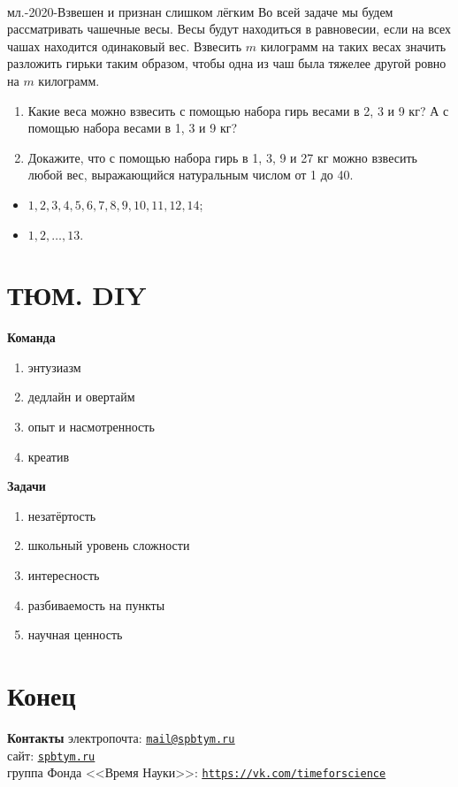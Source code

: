 \documentclass[aspectratio=1610,11pt]{beamer}
\newcommand\fram[2]{\begin{frame}{\bf #1} #2 \end{frame}}
\newcommand\framm[1]{\begin{frame} #1 \end{frame}}
\newcommand{\myref}[2]{\href{#1}{\texttt{\underline{#2}}}}
\def\usl#1#2{\begin{block}{#1} #2 \end{block} \medskip\pause}
\begin{document}
\framm{
\ \vspace{-1cm}
\usl{мл.-2020-Взвешен и признан слишком лёгким}{
Во всей задаче мы будем рассматривать чашечные весы. Весы будут находиться в равновесии, если на всех чашах находится одинаковый вес. Взвесить $m$ килограмм на таких весах значить разложить гирьки таким образом, чтобы одна из чаш была тяжелее другой ровно на $m$ килограмм.
\begin{enumerate}
	\item Какие веса можно взвесить с помощью набора гирь весами в 2, 3 и 9 кг? А с помощью набора весами в 1, 3 и 9 кг?
	\item Докажите, что с помощью набора гирь в 1, 3, 9 и 27 кг можно взвесить любой вес, выражающийся натуральным числом от 1 до 40.
\end{enumerate}
}\vspace{-0.3cm}

\begin{itemize}
	\item $1,2,3,4,5,6,7,8,9,10,11,12,14$;
	\item $1,2,\ldots,13$.
\end{itemize}
}

\section{ТЮМ. DIY}
\fram{Команда}{
\Large
\begin{enumerate}
\item энтузиазм
\item дедлайн и овертайм
\item опыт и насмотренность
\item креатив
\end{enumerate}
}

\fram{Задачи}{
\Large
\begin{enumerate}
\item незатёртость
\item школьный уровень сложности
\item интересность
\item разбиваемость на пункты
\item научная ценность
\end{enumerate}}

\section{Конец}
\fram{Контакты}{\large
электропочта: \hfill \myref{mailto:mail@spbtym.ru}{mail@spbtym.ru} \hspace{1cm} \ \\[2mm]
сайт: \hfill \myref{https://spbtym.ru/}{spbtym.ru} \hspace{1cm} \ \\[2mm]
группа Фонда <<Время Науки>>: \hfill  \myref{https://vk.com/timeforscience}{https://vk.com/timeforscience} \hspace{1cm} \ \\ 
}
\end{document}

